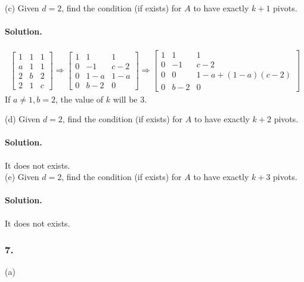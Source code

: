 (c) Given $d = 2$, find the condition (if exists) for $A$ to have exactly $k + 1$ pivots.
\paragraph*{Solution.}
\begin{align*}
    \begin{bmatrix}
        1&1&1\\a&1&1\\2&b&2\\2&1&c
    \end{bmatrix} \Rightarrow \begin{bmatrix}
        1&1&1\\0&-1&c-2\\0&1-a&1-a\\0&b-2&0
    \end{bmatrix} \Rightarrow \begin{bmatrix}
        1&1&1\\0&-1&c-2\\0&0&1-a+(1-a)(c-2)\\0&b-2&0
    \end{bmatrix}
\end{align*}
If $a \neq 1, b = 2$, the value of $k$ will be $3$.

(d) Given $d = 2$, find the condition (if exists) for $A$ to have exactly $k + 2$ pivots.
\paragraph*{Solution.}
It does not exists.\\

(e) Given $d = 2$, find the condition (if exists) for $A$ to have exactly $k + 3$ pivots.
\paragraph*{Solution.}
It does not exists.
\newpage
\subsubsection{7.}
(a)

